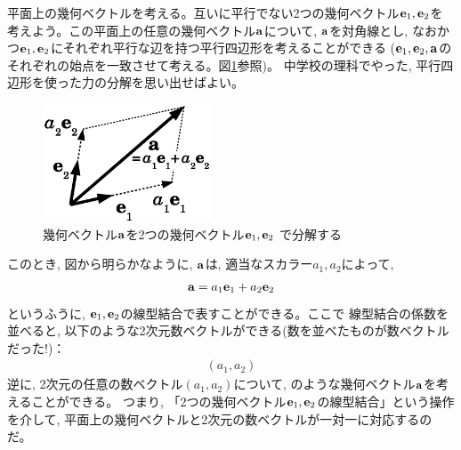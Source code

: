 




平面上の幾何ベクトルを考える。互いに平行でない2つの幾何ベクトル${\bf e}_1, {\bf e}_2$を
考えよう。この平面上の任意の幾何ベクトル${\bf a}$について, ${\bf a}$を対角線とし, 
なおかつ${\bf e}_1, {\bf e}_2$にそれぞれ平行な辺を持つ平行四辺形を考えることができる
(${\bf e}_1, {\bf e}_2, {\bf a}$のそれぞれの始点を一致させて考える。図\ref{fig:vector_1}参照)。
中学校の理科でやった, 平行四辺形を使った力の分解を思い出せばよい。
\begin{figure}
    \centering
    \includegraphics[width=5cm]{vector_1.eps}
    \caption{幾何ベクトル${\bf a}$を2つの幾何ベクトル${\bf e}_1, {\bf e}_2$
で分解する\label{fig:vector_1}}
\end{figure}

このとき, 図から明らかなように, ${\bf a}$は, 適当なスカラー$a_1, a_2$によって, 
\begin{eqnarray}{\bf a}=a_1{\bf e}_1+a_2{\bf e}_2\label{eq:vect_lincomb0}\end{eqnarray}
というふうに, ${\bf e}_1, {\bf e}_2$の線型結合で表すことができる。ここで 
線型結合の係数を並べると, 以下のような2次元数ベクトルができる(数を並べたものが数ベクトルだった!)：
\begin{eqnarray}(a_1, a_2)\label{eq:vect_coordinate}\end{eqnarray}
逆に, 2次元の任意の数ベクトル$(a_1, a_2)$について, 
のような幾何ベクトル${\bf a}$を考えることができる。
つまり, 「2つの幾何ベクトル${\bf e}_1, {\bf e}_2$の線型結合」という操作
を介して, 平面上の幾何ベクトルと2次元の数ベクトルが一対一に対応するのだ。


